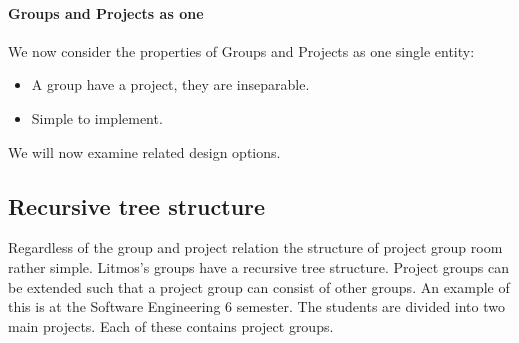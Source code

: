\paragraph{Groups and Projects as one} We now consider the properties of Groups and Projects as one single entity:
\begin{itemize}
	\item A group have a project, they are inseparable.
	\item Simple to implement.
\end{itemize}


We will now examine related design options.

\subsection{Recursive tree structure}
Regardless of the group and project relation the structure of project group room rather simple. 
Litmos's groups have a recursive tree structure. 
Project groups can be extended such that a project group can consist of other groups. 
An example of this is at the Software Engineering 6\ths{} semester. 
The students are divided into two main projects. Each of these contains project groups. 



